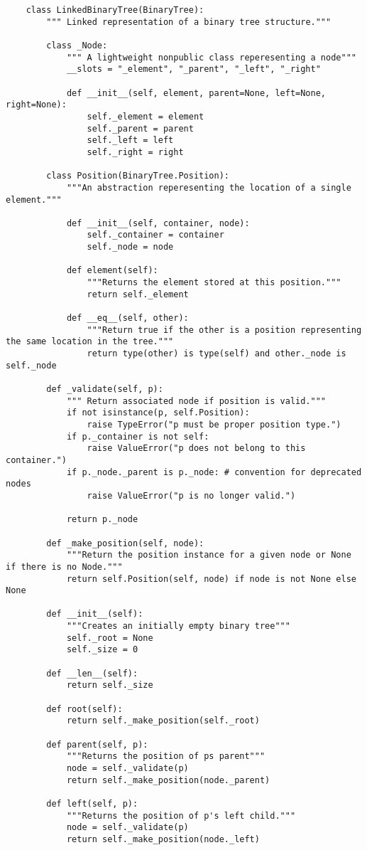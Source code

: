 \documentclass[]{article}
\begin{document}
\begin{lstlisting}
	class LinkedBinaryTree(BinaryTree):
		""" Linked representation of a binary tree structure."""
		
		class _Node:
			""" A lightweight nonpublic class reperesenting a node"""
			__slots = "_element", "_parent", "_left", "_right"
			
			def __init__(self, element, parent=None, left=None, right=None):
				self._element = element
				self._parent = parent
				self._left = left
				self._right = right
				
		class Position(BinaryTree.Position):
			"""An abstraction reperesenting the location of a single element."""
			
			def __init__(self, container, node):
				self._container = container
				self._node = node
			
			def element(self):
				"""Returns the element stored at this position."""
				return self._element
			
			def __eq__(self, other):
				"""Return true if the other is a position representing the same location in the tree."""
				return type(other) is type(self) and other._node is self._node
			
		def _validate(self, p):
			""" Return associated node if position is valid."""
			if not isinstance(p, self.Position):
				raise TypeError("p must be proper position type.")
			if p._container is not self:
				raise ValueError("p does not belong to this container.")
			if p._node._parent is p._node: # convention for deprecated nodes
				raise ValueError("p is no longer valid.")
			
			return p._node
			
		def _make_position(self, node):
			"""Return the position instance for a given node or None if there is no Node."""
			return self.Position(self, node) if node is not None else None
		
		def __init__(self):
			"""Creates an initially empty binary tree"""
			self._root = None
			self._size = 0
			
		def __len__(self):
			return self._size
			
		def root(self):
			return self._make_position(self._root)

		def parent(self, p):
			"""Returns the position of ps parent"""
			node = self._validate(p)
			return self._make_position(node._parent)
		
		def left(self, p):
			"""Returns the position of p's left child."""
			node = self._validate(p)
			return self._make_position(node._left)
			

\end{lstlisting}
\end{document}
